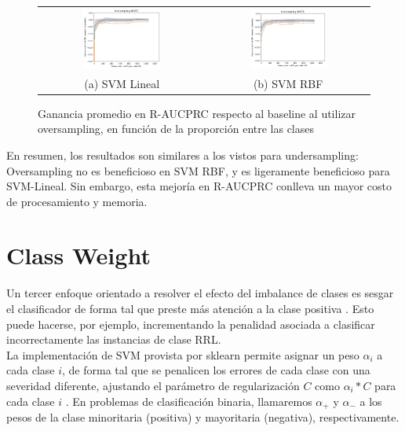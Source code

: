 \begin{figure}[h!]
\begin{tabular}{cc}
    \includegraphics[width=0.49\textwidth]{Kap7/SMOTE_linearBEST.png} & \includegraphics[width=0.49\textwidth]{Kap7/SMOTE_rbfBEST.png} \\
(a) SVM Lineal& (b) SVM RBF
\end{tabular}
\caption{ Ganancia promedio en R-AUCPRC respecto al baseline al utilizar oversampling, en función de la proporción entre las clases }
\label{fig:overall_oversampling}
\end{figure}

En resumen, los resultados son similares a los vistos para undersampling: Oversampling no es beneficioso en SVM RBF, y es ligeramente beneficioso para SVM-Lineal. Sin embargo, esta mejoría en R-AUCPRC conlleva un mayor costo de procesamiento y memoria. 

\section{Class Weight}

Un tercer enfoque orientado a resolver el efecto del imbalance de clases es sesgar el clasificador de forma tal que preste más atención a la clase positiva \cite{imbalanced_svm}. Esto puede hacerse, por ejemplo, incrementando la penalidad asociada a clasificar incorrectamente las instancias de clase RRL. \\

La implementación de SVM provista por sklearn permite asignar un peso $\alpha_i$ a cada clase $i$, de forma tal que se penalicen los errores de cada clase con una severidad diferente, ajustando el parámetro de regularización $C$ como $\alpha_i * C$ para cada clase $i$ . En problemas de clasificación binaria, llamaremos $\alpha_+$ y $\alpha_-$ a los pesos de la clase minoritaria (positiva) y mayoritaria (negativa), respectivamente. \\

